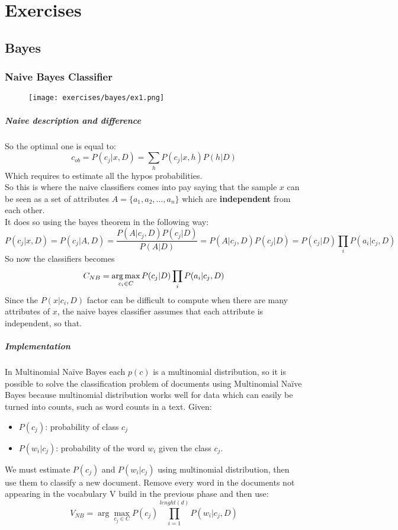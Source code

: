
\newcommand{\argmaxs}[2]{\arg \max_{#2}{#1}}

\chapter{Exercises}

\section{Bayes}

\subsection{Naive Bayes Classifier}

\begin{figure}[H]
    \centering
   \texttt{[image: exercises/bayes/ex1.png]}
\end{figure}


\paragraph{Naive description and difference}
So the optimal one is equal to:
$$c_{ob}=P(c_j|x,D)=\sum_h P(c_j|x,h)P(h|D)$$
Which requires to estimate all the hypos probabilities.\\
So this is where the naive classifiers comes into pay saying that the sample $x$ can be seen as a set of attributes $A=\{a_1,a_2,\dots, a_n\}$ which are \textbf{independent} from each other.\\
It does so using the  bayes theorem in the following way:
$$P(c_j|x,D)=P(c_j|A,D)=\frac{P(A|c_j,D)P(c_j|D)}{P(A|D)}=P(A|c_j,D)P(c_j|D)=P(c_j|D)\prod_i P(a_i|c_j,D)$$
So now the classifiers becomes
$$C_{NB}=\operatorname*{arg\,max}_{c_i \in C}P(c_j|D)\prod_i P(a_i|c_j,D)$$
Since the $P(x| c_i,D)$ factor can be difficult to compute when there are many attributes of $x$, the naive bayes classifier assumes that each attribute is independent, so that.

\paragraph{Implementation }
In Multinomial Naïve Bayes each $p(c)$ is a multinomial distribution, so it is possible to solve the classification problem of documents using Multinomial Naïve Bayes because multinomial distribution works well for data which can easily be turned into counts, such as word counts in a text.
Given:
\begin{itemize}
\item $P(c_j)$: probability of class $c_j$
\item $P(w_i|c_j)$: probability of the word $w_i$ given the class $c_j$.
\end{itemize}
We must estimate $P(c_j)$ and $P(w_i|c_j)$ using multinomial distribution, then use them to classify a new document. Remove every word in the documents not appearing in the vocabulary V build in the previous phase and then use:
\[V_{NB}=\argmaxs{P(c_j)\prod_{i=1}^{lenght(d)}P(w_i|c_j,D)}{c_j \in C}\]


